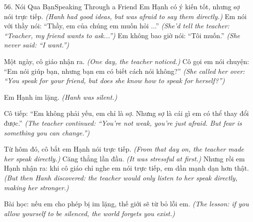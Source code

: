 \begin{truyen}{56. Nói Qua Bạn}{Speaking Through a Friend}
Em Hạnh có ý kiến tốt, nhưng sợ nói trực tiếp.
\textit{(Hanh had good ideas, but was afraid to say them directly.)}
Em nói với thầy nói: ``Thầy, em của chúng em muốn hỏi ...''
\textit{(She'd tell the teacher: ``Teacher, my friend wants to ask...'')}
Em không bao giờ nói: ``Tôi muốn.''
\textit{(She never said: ``I want.'')}

Một ngày, cô giáo nhận ra.
\textit{(One day, the teacher noticed.)}
Cô gọi em nói chuyện: ``Em nói giúp bạn, nhưng bạn em có biết cách nói không?''
\textit{(She called her over: ``You speak for your friend, but does she know how to speak for herself?'')}

Em Hạnh im lặng.
\textit{(Hanh was silent.)}

Cô tiếp: ``Em không phải yếu, em chỉ là sợ. Nhưng sợ là cái gì em có thể thay đổi được.''
\textit{(The teacher continued: ``You're not weak, you're just afraid. But fear is something you can change.'')}

Từ hôm đó, cô bắt em Hạnh nói trực tiếp.
\textit{(From that day on, the teacher made her speak directly.)}
Căng thẳng lần đầu.
\textit{(It was stressful at first.)}
Nhưng rồi em Hạnh nhận ra: khi cô giáo chỉ nghe em nói trực tiếp, em dần mạnh dạn hơn thật.
\textit{(But then Hanh discovered: the teacher would only listen to her speak directly, making her stronger.)}

Bài học: nếu em cho phép bị im lặng, thế giới sẽ từ bỏ lỗi em.
\textit{(The lesson: if you allow yourself to be silenced, the world forgets you exist.)}
\end{truyen}

